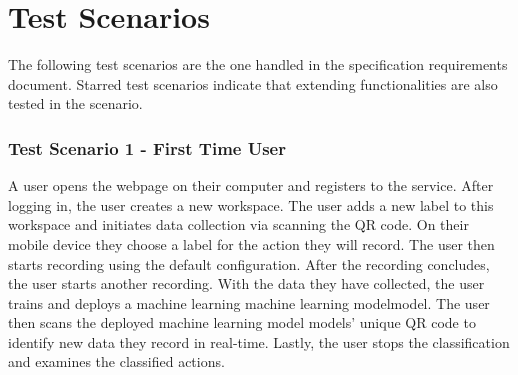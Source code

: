 \newcommand\VRule[1][\arrayrulewidth]{\vrule width #1}
\section{Test Scenarios}
The following test scenarios are the one handled in the specification requirements document. Starred test scenarios indicate that extending functionalities are also tested in the scenario.
\subsubsection{Test Scenario 1 - First Time User}
A user opens the webpage on their computer and registers to the service. After logging in, the user creates a new workspace. The user adds a new label to this workspace and initiates data collection via scanning the QR code. On their mobile device they choose a label for the action they will record. The user then starts recording using the default configuration. After the recording concludes, the user starts another recording. With the data they have collected, the user trains and deploys a machine learning machine learning model{model}. The user then scans the deployed machine learning model models' unique QR code to identify new data they record in real-time. Lastly, the user stops the classification and examines the classified actions.
